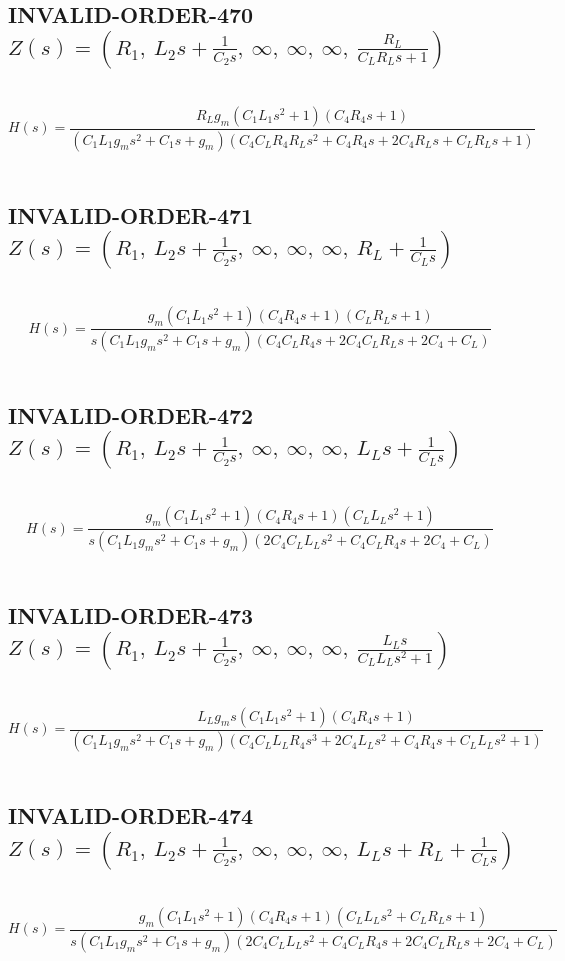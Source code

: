 \documentclass{article}
\begin{document}
\subsection{INVALID-ORDER-470 $Z(s) = \left( R_{1}, \  L_{2} s + \frac{1}{C_{2} s}, \  \infty, \  \infty, \  \infty, \  \frac{R_{L}}{C_{L} R_{L} s + 1}\right)$ } \ 
\textbf{\[H(s) = \frac{R_{L} g_{m} \left(C_{1} L_{1} s^{2} + 1\right) \left(C_{4} R_{4} s + 1\right)}{\left(C_{1} L_{1} g_{m} s^{2} + C_{1} s + g_{m}\right) \left(C_{4} C_{L} R_{4} R_{L} s^{2} + C_{4} R_{4} s + 2 C_{4} R_{L} s + C_{L} R_{L} s + 1\right)}\] } \ 
\subsection{INVALID-ORDER-471 $Z(s) = \left( R_{1}, \  L_{2} s + \frac{1}{C_{2} s}, \  \infty, \  \infty, \  \infty, \  R_{L} + \frac{1}{C_{L} s}\right)$ } \ 
\textbf{\[H(s) = \frac{g_{m} \left(C_{1} L_{1} s^{2} + 1\right) \left(C_{4} R_{4} s + 1\right) \left(C_{L} R_{L} s + 1\right)}{s \left(C_{1} L_{1} g_{m} s^{2} + C_{1} s + g_{m}\right) \left(C_{4} C_{L} R_{4} s + 2 C_{4} C_{L} R_{L} s + 2 C_{4} + C_{L}\right)}\] } \ 
\subsection{INVALID-ORDER-472 $Z(s) = \left( R_{1}, \  L_{2} s + \frac{1}{C_{2} s}, \  \infty, \  \infty, \  \infty, \  L_{L} s + \frac{1}{C_{L} s}\right)$ } \ 
\textbf{\[H(s) = \frac{g_{m} \left(C_{1} L_{1} s^{2} + 1\right) \left(C_{4} R_{4} s + 1\right) \left(C_{L} L_{L} s^{2} + 1\right)}{s \left(C_{1} L_{1} g_{m} s^{2} + C_{1} s + g_{m}\right) \left(2 C_{4} C_{L} L_{L} s^{2} + C_{4} C_{L} R_{4} s + 2 C_{4} + C_{L}\right)}\] } \ 
\subsection{INVALID-ORDER-473 $Z(s) = \left( R_{1}, \  L_{2} s + \frac{1}{C_{2} s}, \  \infty, \  \infty, \  \infty, \  \frac{L_{L} s}{C_{L} L_{L} s^{2} + 1}\right)$ } \ 
\textbf{\[H(s) = \frac{L_{L} g_{m} s \left(C_{1} L_{1} s^{2} + 1\right) \left(C_{4} R_{4} s + 1\right)}{\left(C_{1} L_{1} g_{m} s^{2} + C_{1} s + g_{m}\right) \left(C_{4} C_{L} L_{L} R_{4} s^{3} + 2 C_{4} L_{L} s^{2} + C_{4} R_{4} s + C_{L} L_{L} s^{2} + 1\right)}\] } \ 
\subsection{INVALID-ORDER-474 $Z(s) = \left( R_{1}, \  L_{2} s + \frac{1}{C_{2} s}, \  \infty, \  \infty, \  \infty, \  L_{L} s + R_{L} + \frac{1}{C_{L} s}\right)$ } \ 
\textbf{\[H(s) = \frac{g_{m} \left(C_{1} L_{1} s^{2} + 1\right) \left(C_{4} R_{4} s + 1\right) \left(C_{L} L_{L} s^{2} + C_{L} R_{L} s + 1\right)}{s \left(C_{1} L_{1} g_{m} s^{2} + C_{1} s + g_{m}\right) \left(2 C_{4} C_{L} L_{L} s^{2} + C_{4} C_{L} R_{4} s + 2 C_{4} C_{L} R_{L} s + 2 C_{4} + C_{L}\right)}\] } \ 
\end{document}
